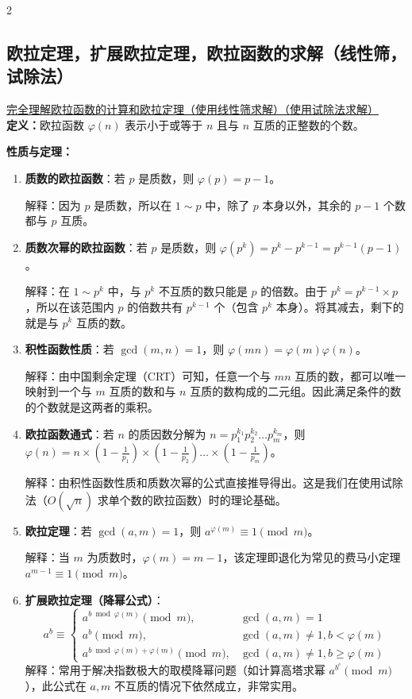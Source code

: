 \begin{multicols*}{2}
		\subsection{欧拉定理，扩展欧拉定理，欧拉函数的求解（线性筛，试除法）}

		\href{https://www.notion.so/3224539447bd808f8f75de0c99a12864?pvs=21}{完全理解欧拉函数的计算和欧拉定理（使用线性筛求解）（使用试除法求解）} \\

		\textbf{定义：}欧拉函数 $\varphi(n)$ 表示小于或等于 $n$ 且与 $n$ 互质的正整数的个数。

		\textbf{性质与定理：}
		\begin{enumerate}
			\item \textbf{质数的欧拉函数}：若 $p$ 是质数，则 $\varphi(p) = p - 1$。

			解释：因为 $p$ 是质数，所以在 $1 \sim p$ 中，除了 $p$ 本身以外，其余的 $p-1$ 个数都与 $p$ 互质。

			\item \textbf{质数次幂的欧拉函数}：若 $p$ 是质数，则 $\varphi(p^k)=p^k - p^{k-1} = p^{k-1}(p-1)$。

			解释：在 $1 \sim p^k$ 中，与 $p^k$ 不互质的数只能是 $p$ 的倍数。由于 $p^k = p^{k-1} \times p$，所以在该范围内 $p$ 的倍数共有 $p^{k-1}$ 个（包含 $p^k$ 本身）。将其减去，剩下的就是与 $p^k$ 互质的数。

			\item \textbf{积性函数性质}：若 $\gcd(m, n) = 1$，则 $\varphi(mn) = \varphi(m)\varphi(n)$。

			解释：由中国剩余定理（CRT）可知，任意一个与 $mn$ 互质的数，都可以唯一映射到一个与 $m$ 互质的数和与 $n$ 互质的数构成的二元组。因此满足条件的数的个数就是这两者的乘积。

			\item \textbf{欧拉函数通式}：若 $n$ 的质因数分解为 $n = p_1^{k_1} p_2^{k_2} \dots p_m^{k_m}$，则 $\varphi(n) = n \times (1 - \frac{1}{p_1}) \times (1 - \frac{1}{p_2}) \dots \times (1 - \frac{1}{p_m})$。

			解释：由积性函数性质和质数次幂的公式直接推导得出。这是我们在使用试除法（$O(\sqrt{n})$ 求单个数的欧拉函数）时的理论基础。

			\item \textbf{欧拉定理}：若 $\gcd(a, m) = 1$，则 $a^{\varphi(m)} \equiv 1 \pmod m$。

			解释：当 $m$ 为质数时，$\varphi(m) = m-1$，该定理即退化为常见的费马小定理 $a^{m-1} \equiv 1 \pmod m$。

			\item \textbf{扩展欧拉定理（降幂公式）}：
			$$
			a^b \equiv
			\begin{cases}
				a^{b \bmod \varphi(m)} \pmod m, & \gcd(a,m)=1 \\
				a^b \pmod m, & \gcd(a,m) \neq 1, b < \varphi(m) \\
				a^{b \bmod \varphi(m) + \varphi(m)} \pmod m, & \gcd(a,m) \neq 1, b \ge \varphi(m)
			\end{cases}
			$$
			解释：常用于解决指数极大的取模降幂问题（如计算高塔求幂 $a^{b^c} \pmod m$），此公式在 $a, m$ 不互质的情况下依然成立，非常实用。
		\end{enumerate}


\end{multicols*}
